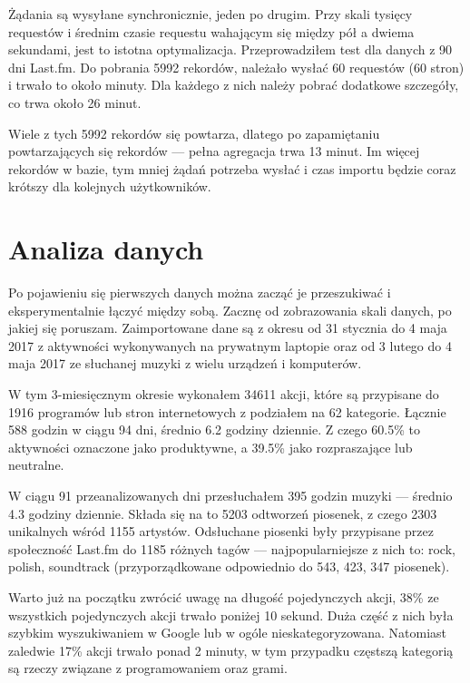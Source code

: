 \documentclass[brudnopis]{xmgr}
\begin{document}
		Żądania są wysyłane synchronicznie, jeden po drugim.
		Przy skali tysięcy requestów i średnim czasie requestu wahającym się między pół a dwiema sekundami, jest to istotna optymalizacja.
		Przeprowadziłem test dla danych z 90 dni Last.fm. Do pobrania 5992 rekordów, należało wysłać 60 requestów (60 stron) i trwało to około minuty.
		Dla każdego z nich należy pobrać dodatkowe szczegóły, co trwa około 26 minut.

		Wiele z tych 5992 rekordów się powtarza, dlatego po zapamiętaniu powtarzających się rekordów --- pełna agregacja trwa 13 minut.
		Im więcej rekordów w bazie, tym mniej żądań potrzeba wysłać i czas importu będzie coraz krótszy dla kolejnych użytkowników.

\chapter{Analiza danych}

	Po pojawieniu się pierwszych danych można zacząć je przeszukiwać i eksperymentalnie łączyć między sobą.
	Zacznę od zobrazowania skali danych, po jakiej się poruszam.
	Zaimportowane dane są z okresu od 31 stycznia do 4 maja 2017 z aktywności wykonywanych na prywatnym laptopie
	oraz od 3 lutego do 4 maja 2017 ze słuchanej muzyki z wielu urządzeń i komputerów.

	W tym 3-miesięcznym okresie wykonałem 34611 akcji, które są przypisane do 1916 programów lub stron internetowych z podziałem na 62 kategorie.
	Łącznie 588 godzin w ciągu 94 dni, średnio 6.2 godziny dziennie.
	Z czego 60.5\% to aktywności oznaczone jako produktywne, a 39.5\% jako rozpraszające lub neutralne.

	W ciągu 91 przeanalizowanych dni przesłuchałem 395 godzin muzyki — średnio 4.3 godziny dziennie.
	Składa się na to 5203 odtworzeń piosenek, z czego 2303 unikalnych wśród 1155 artystów.
	Odsłuchane piosenki były przypisane przez społeczność Last.fm do 1185 różnych tagów — najpopularniejsze z nich to: rock, polish, soundtrack
	(przyporządkowane odpowiednio do 543, 423, 347 piosenek).

	Warto już na początku zwrócić uwagę na długość pojedynczych akcji, 38\% ze wszystkich pojedynczych akcji trwało poniżej 10 sekund.
	Duża część z nich była szybkim wyszukiwaniem w Google lub w ogóle nieskategoryzowana.
	Natomiast zaledwie 17\% akcji trwało ponad 2 minuty, w tym przypadku częstszą kategorią są rzeczy związane z programowaniem oraz grami.
\end{document}
